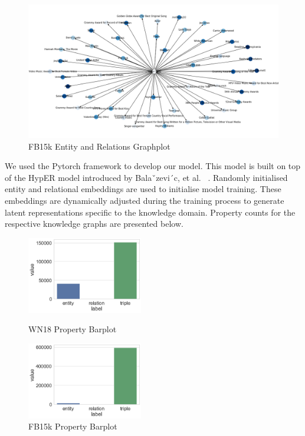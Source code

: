 \begin{figure}[H]
   	\centering
    	\includegraphics[width=\textwidth]{FB15k_Graph}
	\caption{FB15k Entity and Relations Graphplot}
\end{figure}

\noindent We used the Pytorch framework to develop our model. This model is built on top of the HypER model introduced by Balaˇzevi´c, et al. ~\citep{balazevic2019hypernetwork}. Randomly initialised entity and relational embeddings are used to initialise model training. These embeddings are dynamically adjusted during the training process to generate latent representations specific to the knowledge domain. Property counts for the respective knowledge graphs are presented below.

\bigskip

\begin{figure}[H]
	\parbox{.5\linewidth}{
   		\centering
    		\includegraphics[width=0.45\textwidth]{WN18_Counts}
		\caption{WN18 Property Barplot}
		}
	\hfill
	\parbox{.5\linewidth}{
   		\centering
    		\includegraphics[width=0.45\textwidth]{FB15k_Counts}
		\caption{FB15k Property Barplot}
		}
\end{figure}


